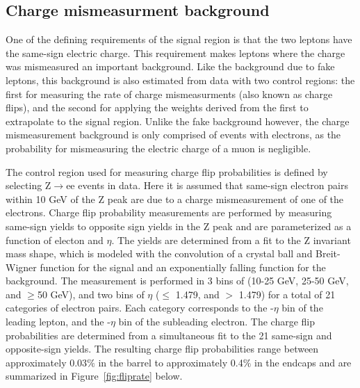 \subsection{Charge mismeasurment background}
One of the defining requirements of the signal region is that the two leptons have the same-sign electric charge. This requirement makes leptons where the charge was mismeasured an important background. Like the background due to fake leptons,
this background is also estimated from data with two control regions: the first for measuring the rate of charge mismeasurments (also known as charge flips), and the second for applying the weights derived from the first to extrapolate to
the signal region. Unlike the fake background however, the charge mismeasurement background is only comprised of events with electrons, as the probability for mismeasuring the electric charge of a muon is negligible.

The control region used for measuring charge flip probabilities is defined by selecting Z$\rightarrow$ee events in data. Here it is assumed that same-sign electron pairs within 10 GeV of the Z peak are due to a charge mismeasurement of one of
the electrons. Charge flip probability measurements are performed by measuring same-sign yields to opposite sign yields in the Z peak and are parameterized as a function of electon \pt and $\eta$.
The yields are determined from a fit to the Z invariant mass shape, which is modeled with the convolution of a crystal ball and Breit-Wigner function for the signal and an exponentially falling function for the background. 
The measurement is performed in 3 bins of \pt (10-25 GeV, 25-50 GeV, and $\geq$50 GeV), and two bins of $\eta$ ($\leq$ 1.479, and $>$ 1.479) for a total of 21 categories of electron pairs. Each category corresponds to the \pt-$\eta$ bin
of the leading lepton, and the \pt-$\eta$ bin of the subleading electron.  
The charge flip probabilities are determined from a simultaneous fit to the 21 same-sign and opposite-sign yields. The resulting charge flip probabilities range between approximately 0.03$\%$ in the barrel
to approximately 0.4$\%$ in the endcaps and are summarized in Figure~\ref{fig:fliprate} below.

